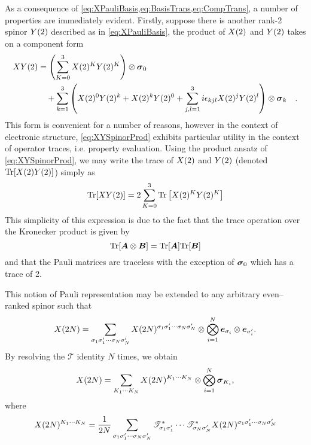 As a consequence of \cref{eq:XPauliBasis,eq:BasisTrans,eq:CompTrans}, a number of properties are immediately evident. Firstly,
suppose there is another rank-2 spinor $\spinor{2}{Y}$ described as in \cref{eq:XPauliBasis}, the product of $\spinor{2}{X}$ and 
$\spinor{2}{Y}$ takes on a component form
\begin{align}
\label{eq:XYSpinorProd}
\spinor{2}{XY} &= \left(\sum_{K = 0 }^3 \spinor{2}{X}^K \spinor{2}{Y}^K\right) \otimes \pauli{0}   \nonumber \\
&\quad  + \sum_{k = 1}^3 \left( \spinor{2}{X}^0 \spinor{2}{Y}^k + \spinor{2}{X}^k \spinor{2}{Y}^0 + \sum_{j,l = 1}^3 i\epsilon_{kjl}\spinor{2}{X}^j \spinor{2}{Y}^l \right) 
    \otimes \pauli{k}
    \quad.
\end{align}
This form is convenient for a number of reasons, however in the context of electronic structure, \cref{eq:XYSpinorProd} exhibits particular utility in the
context of operator traces, i.e. property evaluation. Using the product ansatz of \cref{eq:XYSpinorProd}, we may write the trace of $\spinor{2}{X}$ and
$\spinor{2}{Y}$ (denoted $\mathrm{Tr}[\spinor{2}{X}\spinor{2}{Y}]$) simply as
\begin{equation}
\mathrm{Tr}[\spinor{2}{XY}] = 2\sum_{K = 0}^3 \mathrm{Tr}\left[\spinor{2}{X}^K\spinor{2}{Y}^K\right]
\end{equation}
This simplicity of this expression is due to the fact that the trace operation over the Kronecker product is given by
\begin{equation}
\mathrm{Tr}[\vc{A} \otimes \vc{B}] = \mathrm{Tr}[\vc{A}]\mathrm{Tr}[\vc{B}]
\end{equation}
and that the Pauli matrices are traceless with the exception of $\pauli{0}$ which has a trace of 2.

This notion of Pauli representation may be extended to any arbitrary even--ranked spinor such that
\begin{equation}
\spinor{2N}{X} = \sum_{\sigma_1\sigma_1'\cdots \sigma_N\sigma_N'} \spinor{2N}{X}^{\sigma_1\sigma_1'\cdots \sigma_N\sigma_N'} \otimes 
  \bigotimes_{i = 1}^N  \vc e_{\sigma_i} \otimes \vc e_{\sigma_i'}.
\end{equation}
By resolving the $\mathscr{T}$ identity $N$ times, we obtain
\begin{equation}
\spinor{2N}{X} = \sum_{K_1\cdots K_N} \spinor{2N}{X}^{K_1\cdots K_N} \otimes
  \bigotimes_{i=1}^N \pauli{K_i},
\end{equation}
where
\begin{equation}
\spinor{2N}{X}^{K_1\cdots K_N} = \frac{1}{2N} \sum_{\sigma_1\sigma_1'\cdots \sigma_N\sigma_N'} 
  \mathscr{T}^*_{\sigma_1\sigma'_1}\cdots\mathscr{T}^*_{\sigma_N\sigma'_N}\spinor{2N}{X}^{\sigma_1\sigma_1'\cdots \sigma_N\sigma_N'}  
\end{equation}

